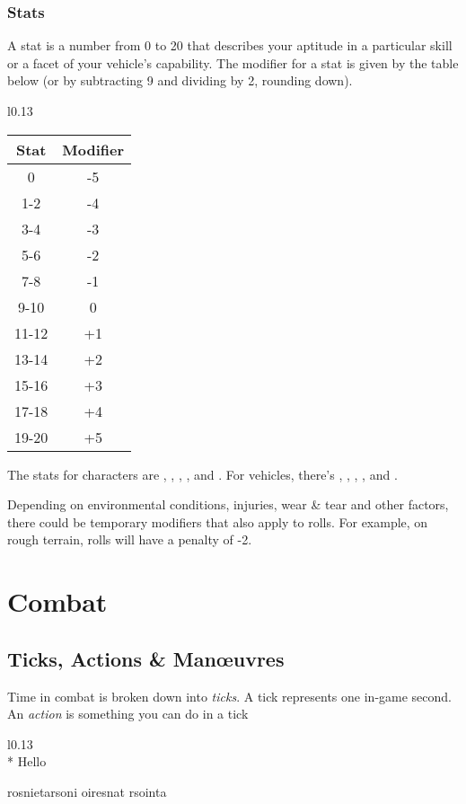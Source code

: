 \documentclass[10pt, a4paper, twocolumn]{book}
\begin{document}
\subsection{Stats}
A stat is a number from 0 to 20 that describes your aptitude in a particular
skill or a facet of your vehicle's capability. The modifier for a stat is
given by the table below (or by subtracting 9 and dividing by 2, rounding
down).

\begin{wraptable}{l}{0.13\textwidth}
\vspace*{-10pt}
\begin{tabular}{cc}
  Stat  & Modifier \\
  \hline 
  0     & -5       \\
  1-2   & -4       \\
  3-4   & -3       \\
  5-6   & -2       \\
  7-8   & -1       \\
  9-10  &  0       \\
  11-12 & +1       \\
  13-14 & +2       \\
  15-16 & +3       \\
  17-18 & +4       \\
  19-20 & +5
\end{tabular}
\vspace*{-10pt}
\end{wraptable}

The stats for characters are , , , ,
 and . For vehicles, there's ,
, , ,  and .

Depending on environmental conditions, injuries, wear \&
tear and other factors, there could be temporary modifiers that also apply to
rolls. For example, on rough terrain,  rolls will have a penalty
of -2.

\chapter{Combat}
\section{Ticks, Actions \& Man\oe{}uvres}
Time in combat is broken down into \emph{ticks}. A tick represents one in-game
second. An \emph{action} is something you can do in a tick

\begin{wrapfigure}{l}{0.13\textwidth}
  \textbf{}\\*
  Hello
\end{wrapfigure}

rosnietarsoni oiresnat rsointa
\end{document}
